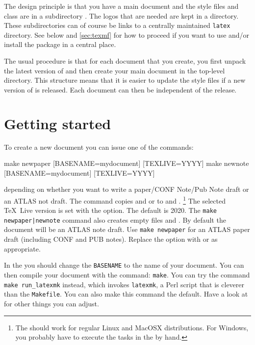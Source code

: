 The design principle is that you have a main document and 
the style files and  class are in a subdirectory .
The logos that are needed are kept in a  directory.
These subdirectories can of course be links to a centrally maintained \texttt{latex} directory.
See below and \cref{sec:texmf} for how to proceed if you want to use and/or install
the package in a central place.

The usual procedure is that for each document that you create,
you first unpack the latest version of  and
then create your main document in the top-level directory.
This structure means that it is easier to update the style files if a new version of
 is released. 
Each document can then be independent of the  release.

\section{Getting started}

To create a new document you can issue one of the commands:
%
\begin{bashlisting}
make newpaper [BASENAME=mydocument] [TEXLIVE=YYYY]
make newnote [BASENAME=mydocument] [TEXLIVE=YYYY]
\end{bashlisting}
depending on whether you want to write a paper/CONF Note/Pub Note draft or
an ATLAS not draft.
%
The command copies  and
 or 
to  and .%
\footnote{The  should work for regular Linux and MacOSX distributions.
For Windows, you probably have to execute the tasks in the  by hand.}
The selected \TeX\ Live version is set with the  option. The default is 2020.
The \texttt{make newpaper|newnote} command also creates empty files  and .
By default the document will be an ATLAS note draft.
Use \texttt{make newpaper} for an ATLAS paper draft (including CONF and PUB notes).
Replace the option  with  or  as appropriate.

In the  you should change the \texttt{BASENAME} to the name of your document.
You can then compile your document with the command: \texttt{make}.
You can try the command \texttt{make run\_latexmk} instead,
which invokes \texttt{latexmk}, a Perl script that is cleverer than the \texttt{Makefile}.
You can also make this command the default.
Have a look at  for other things you can adjust.

